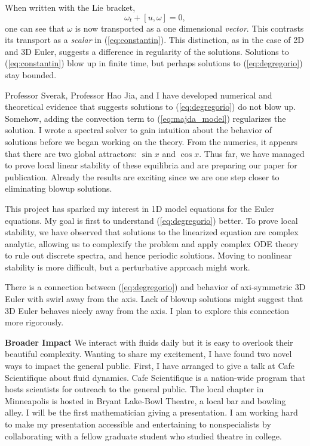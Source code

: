 \documentclass[12pt]{article}
\begin{document}
When written with the Lie bracket, 
\[
	\omega_t + [u, \omega] = 0,
\]
one can see that $\omega$ is now transported as a one dimensional \textit{vector}. This contrasts its transport as a \textit{scalar} in (\ref{eq:constantin}). This distinction, as in the case of 2D and 3D Euler, suggests a difference in regularity of the solutions. Solutions to (\ref{eq:constantin}) blow up in finite time, but perhaps solutions to (\ref{eq:degregorio}) stay bounded.

Professor Sverak, Professor Hao Jia, and I have developed numerical and theoretical evidence that suggests solutions to (\ref{eq:degregorio}) do not blow up. Somehow, adding the convection term to (\ref{eq:majda_model}) regularizes the solution. I wrote a spectral solver to gain intuition about the behavior of solutions before we began working on the theory. From the numerics, it appears that there are two global attractors: $\sin x$ and $\cos x$. Thus far, we have managed to prove local linear stability of these equilibria and are preparing our paper for publication. Already the results are exciting since we are one step closer to eliminating blowup solutions. 

This project has sparked my interest in 1D model equations for the Euler equations. My goal is first to understand (\ref{eq:degregorio}) better. To prove local stability, we have observed that solutions to the linearized equation are complex analytic, allowing us to complexify the problem and apply complex ODE theory to rule out discrete spectra, and hence periodic solutions. Moving to nonlinear stability is more difficult, but a perturbative approach might work.


There is a connection between (\ref{eq:degregorio}) and behavior of axi-symmetric 3D Euler with swirl away from the axis. Lack of blowup solutions might suggest that 3D Euler behaves nicely away from the axis. I plan to explore this connection more rigorously.

\textbf{Broader Impact}
We interact with fluids daily but it is easy to overlook their beautiful complexity. Wanting to share my excitement, I have found two novel ways to impact the general public. First, I have arranged to give a talk at Cafe Scientifique about fluid dynamics. Cafe Scientifique is a nation-wide program that hosts scientists for outreach to the general public. The local chapter in Minneapolis is hosted in Bryant Lake-Bowl Theatre, a local bar and bowling alley. I will be the first mathematician giving a presentation. I am working hard to make my presentation accessible and entertaining to nonspecialists by collaborating with a fellow graduate student who studied theatre in college. 
\end{document}
